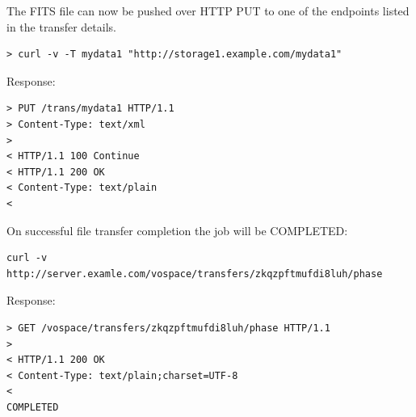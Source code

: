 \documentclass[11pt,a4paper]{ivoa}
\begin{document}
The FITS file can now be pushed over HTTP PUT to one of the endpoints listed in the transfer details.
\begin{lstlisting}
> curl -v -T mydata1 "http://storage1.example.com/mydata1"
\end{lstlisting}
Response:
\begin{lstlisting}
> PUT /trans/mydata1 HTTP/1.1
> Content-Type: text/xml
>
< HTTP/1.1 100 Continue
< HTTP/1.1 200 OK
< Content-Type: text/plain
<
\end{lstlisting}
On successful file transfer completion the job will be COMPLETED:
\begin{lstlisting}
curl -v http://server.examle.com/vospace/transfers/zkqzpftmufdi8luh/phase
\end{lstlisting}
Response:
\begin{lstlisting}
> GET /vospace/transfers/zkqzpftmufdi8luh/phase HTTP/1.1
>
< HTTP/1.1 200 OK
< Content-Type: text/plain;charset=UTF-8
<
COMPLETED
\end{lstlisting}
\end{document}
